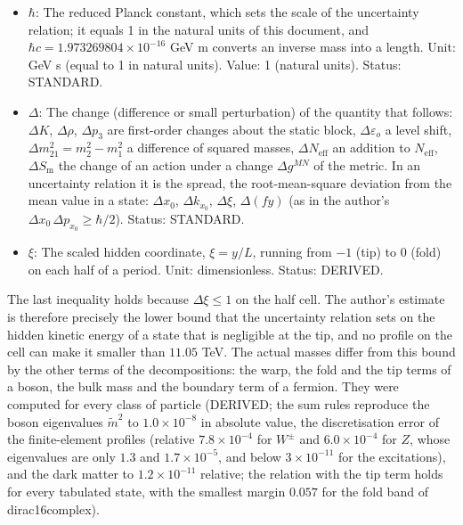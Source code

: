 \documentclass[
  10pt,
]{article}
\begin{document}
\begin{itemize}
  is the lower bound on the mass that the uncertainty relation would
  give if the hidden kinetic energy were the whole mass and the state
  were negligible at the tip. (The subscript stands for Heisenberg; UM-2
  has no Higgs particle.) Unit: GeV. Value: 70.56 TeV (photon, gluons,
  graviton, \(W^\pm\), \(Z\)); 53.80 TeV (quark-doublet zero mode);
  93.08 TeV (lepton-doublet zero mode); 22.90 TeV (fold band of
  dirac16complex); 19.39 TeV (dark matter); at least \(1/(2fL) = 11.05\)
  TeV for every profile on the cell. Status: DERIVED.
\item
  \(\hbar\): The reduced Planck constant, which sets the scale of the
  uncertainty relation; it equals 1 in the natural units of this
  document, and \(\hbar c = 1.973269804\times10^{-16}\) GeV m converts
  an inverse mass into a length. Unit: GeV s (equal to 1 in natural
  units). Value: 1 (natural units). Status: STANDARD.
\item
  \(\Delta\): The change (difference or small perturbation) of the
  quantity that follows: \(\Delta K\), \(\Delta\rho\), \(\Delta p_3\)
  are first-order changes about the static block,
  \(\Delta\varepsilon_o\) a level shift,
  \(\Delta m^2_{21} = m_2^2 - m_1^2\) a difference of squared masses,
  \(\Delta N_{\mathrm{eff}}\) an addition to \(N_{\mathrm{eff}}\),
  \(\Delta S_{\mathrm{m}}\) the change of an action under a change
  \(\Delta g^{MN}\) of the metric. In an uncertainty relation it is the
  spread, the root-mean-square deviation from the mean value in a state:
  \(\Delta x_0\), \(\Delta k_{x_0}\), \(\Delta\xi\), \(\Delta(fy)\) (as
  in the author's \(\Delta x_0\,\Delta p_{x_0} \ge \hbar/2\)). Status:
  STANDARD.
\item
  \(\xi\): The scaled hidden coordinate, \(\xi = y/L\), running from
  \(-1\) (tip) to \(0\) (fold) on each half of a period. Unit:
  dimensionless. Status: DERIVED.
\end{itemize}

The last inequality holds because \(\Delta\xi \le 1\) on the half cell.
The author's estimate is therefore precisely the lower bound that the
uncertainty relation sets on the hidden kinetic energy of a state that
is negligible at the tip, and no profile on the cell can make it smaller
than \(11.05\) TeV. The actual masses differ from this bound by the
other terms of the decompositions: the warp, the fold and the tip terms
of a boson, the bulk mass and the boundary term of a fermion. They were
computed for every class of particle (DERIVED; the sum rules reproduce
the boson eigenvalues \(\tilde m^2\) to \(1.0\times10^{-8}\) in absolute
value, the discretisation error of the finite-element profiles (relative
\(7.8\times10^{-4}\) for \(W^\pm\) and \(6.0\times10^{-4}\) for \(Z\),
whose eigenvalues are only \(1.3\) and \(1.7\times10^{-5}\), and below
\(3\times10^{-11}\) for the excitations), and the dark matter to
\(1.2\times10^{-11}\) relative; the relation with the tip term holds for
every tabulated state, with the smallest margin \(0.057\) for the fold
band of dirac16complex).
\end{document}
